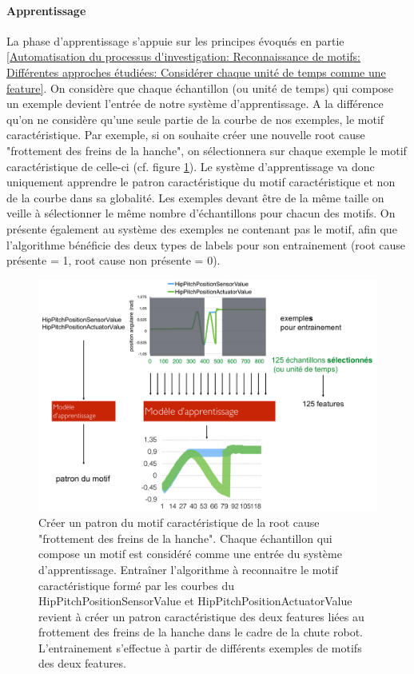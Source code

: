 \paragraph{Apprentissage} La phase d'apprentissage s'appuie sur les principes évoqués en partie \ref{Automatisation du processus d'investigation: Reconnaissance de motifs: Différentes approches étudiées: Considérer chaque unité de temps comme une feature}. On considère que chaque échantillon (ou unité de temps) qui compose un exemple devient l'entrée de notre système d'apprentissage. A la différence qu'on ne considère qu'une seule partie de la courbe de nos exemples, le motif caractéristique. Par exemple, si on souhaite créer une nouvelle root cause "frottement des freins de la hanche", on sélectionnera sur chaque exemple le motif caractéristique de celle-ci (cf. figure \ref{fig:Créer un patron du motif caractéristique de la root cause "frottement des freins de la hanche"}). Le système d'apprentissage va donc uniquement apprendre le patron caractéristique du motif caractéristique et non de la courbe dans sa globalité. Les exemples devant être de la même taille on veille à sélectionner le même nombre d'échantillons pour chacun des motifs. On présente également au système des exemples ne contenant pas le motif, afin que l'algorithme bénéficie des deux types de labels pour son entrainement (root cause présente = 1, root cause non présente = 0).

\begin{figure}[h]
	\centering\includegraphics[width=14cm]{images/patron_motif.png}
	\caption[Créer un patron du motif caractéristique de la root cause "frottement des freins de la hanche"]{Créer un patron du motif caractéristique de la root cause "frottement des freins de la hanche". Chaque échantillon qui compose un motif est considéré comme une entrée du système d'apprentissage. Entraîner l'algorithme à reconnaitre le motif caractéristique formé par les courbes du HipPitchPositionSensorValue et HipPitchPositionActuatorValue revient à créer un patron caractéristique des deux features liées au frottement des freins de la hanche dans le cadre de la chute robot. L'entrainement s'effectue à partir de différents exemples de motifs des deux features.}
	\label{fig:Créer un patron du motif caractéristique de la root cause "frottement des freins de la hanche"}
\end{figure}

